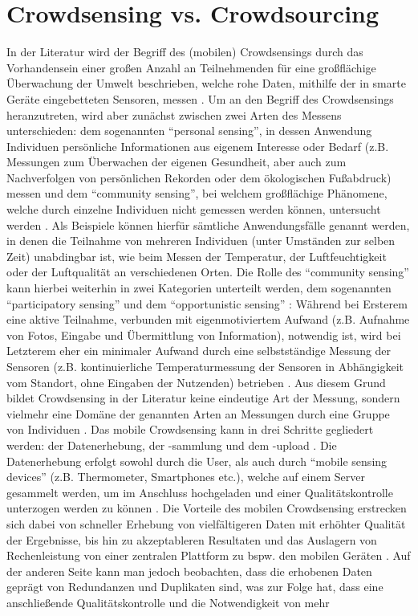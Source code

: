 \section{Crowdsensing vs. Crowdsourcing}
\label{sec:crowdsensing}
In der Literatur wird der Begriff des (mobilen) Crowdsensings durch das Vorhandensein einer großen Anzahl an Teilnehmenden für eine großflächige Überwachung der Umwelt beschrieben, welche rohe Daten, mithilfe der in smarte Geräte eingebetteten Sensoren, messen \cite{Ray2022}. Um an den Begriff des Crowdsensings heranzutreten, wird aber zunächst zwischen zwei Arten des Messens unterschieden: dem sogenannten \enquote{personal sensing}, in dessen Anwendung Individuen persönliche Informationen aus eigenem Interesse oder Bedarf (z.B. Messungen zum Überwachen der eigenen Gesundheit, aber auch zum Nachverfolgen von persönlichen Rekorden oder dem ökologischen Fußabdruck) messen und dem \enquote{community sensing}, bei welchem großflächige Phänomene, welche durch einzelne Individuen nicht gemessen werden können, untersucht werden \cite{Ganti2011}. \newline Als Beispiele können hierfür sämtliche Anwendungsfälle genannt werden, in denen die Teilnahme von mehreren Individuen (unter Umständen zur selben Zeit) unabdingbar ist, wie beim Messen der Temperatur, der Luftfeuchtigkeit oder der Luftqualität an verschiedenen Orten. Die Rolle des \enquote{community sensing} kann hierbei weiterhin in zwei Kategorien unterteilt werden, dem sogenannten \enquote{participatory sensing} \cite{Burke2006} und dem \enquote{opportunistic sensing} \cite{Lane2010}: \newline Während bei Ersterem eine aktive Teilnahme, verbunden mit eigenmotiviertem Aufwand (z.B. Aufnahme von Fotos, Eingabe und Übermittlung von Information), notwendig ist, wird bei Letzterem eher ein minimaler Aufwand durch eine selbstständige Messung der Sensoren (z.B. kontinuierliche Temperaturmessung der Sensoren in Abhängigkeit vom Standort, ohne Eingaben der Nutzenden) betrieben \cite{Ganti2011}. Aus diesem Grund bildet Crowdsensing in der Literatur keine eindeutige Art der Messung, sondern vielmehr eine Domäne der genannten Arten an Messungen durch eine Gruppe von Individuen \cite{Ganti2011}. \newline Das mobile Crowdsensing kann in drei Schritte gegliedert werden: der Datenerhebung, der -sammlung und dem -upload \cite{Ray2022}. Die Datenerhebung erfolgt sowohl durch die User, als auch durch \enquote{mobile sensing devices} (z.B. Thermometer, Smartphones etc.), welche auf einem Server gesammelt werden, um im Anschluss hochgeladen und einer Qualitätskontrolle unterzogen werden zu können \cite{Ray2022}. Die Vorteile des mobilen Crowdsensing erstrecken sich dabei von schneller Erhebung von vielfältigeren Daten mit erhöhter Qualität der Ergebnisse, bis hin zu akzeptableren Resultaten und das Auslagern von Rechenleistung von einer zentralen Plattform zu bspw. den mobilen Geräten \cite{Ray2022}. Auf der anderen Seite kann man jedoch beobachten, dass die erhobenen Daten geprägt von Redundanzen und Duplikaten sind, was zur Folge hat, dass eine anschließende Qualitätskontrolle und die Notwendigkeit von mehr 